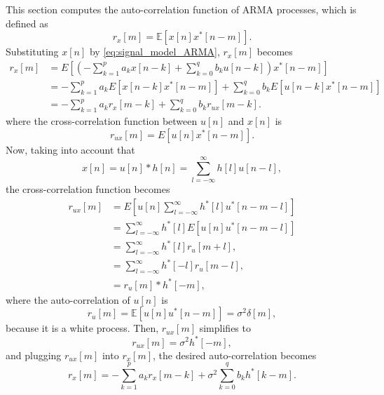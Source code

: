 This section computes the auto-correlation function of ARMA processes, which is defined as
\begin{equation*}
	r_{x}[m] = \mathbb{E}[x[n] x^{\ast}[n-m]].
\end{equation*}
Substituting $x[n]$ by \eqref{eq:signal_model_ARMA}, $r_{x}[m]$ becomes
\begin{align*}
r_{x}[m] &= E\left[ \left(- \sum_{k = 1}^{p} a_k x[n -k]  + \sum_{k = 0}^{q} b_k u[n-k] \right) x^{\ast}[n-m]\right] \nonumber \\
&=  - \sum_{k = 1}^{p} a_k E\left[x[n -k] x^{\ast}[n-m]\right] + \sum_{k = 0}^{q} b_k  E\left[u[n-k]  x^{\ast}[n-m]\right] \nonumber \\
&=  - \sum_{k = 1}^{p} a_k r_{x}[m-k] + \sum_{k = 0}^{q} b_k  r_{ux}[m-k].
\end{align*}
where the cross-correlation function between $u[n]$ and $x[n]$ is
\begin{equation*}
r_{ux}[m] =   E\left[u[n]  x^{\ast}[n-m]\right].
\end{equation*}
Now, taking into account that
\begin{equation*}
x[n] = u[n] \ast h[n] = \sum_{l = -\infty}^{\infty} h[l] u[n-l],
\end{equation*}
the cross-correlation function becomes
\begin{align*}
r_{ux}[m] &=   E\left[u[n]  \sum_{l = -\infty}^{\infty} h^{\ast}[l] u^{\ast}[n-m-l]\right] \nonumber \\
&=   \sum_{l = -\infty}^{\infty} h^{\ast}[l] E\left[u[n]   u^{\ast}[n-m-l]\right] \nonumber \\
&=   \sum_{l = -\infty}^{\infty} h^{\ast}[l] r_u [m+l], \nonumber \\
&=   \sum_{l = -\infty}^{\infty} h^{\ast}[-l] r_u [m-l], \nonumber \\
&=   r_u [m] \ast h^{\ast}[-m],
\end{align*}
where the auto-correlation of $u[n]$ is
\begin{equation*}
r_{u}[m] = \mathbb{E}[u[n] u^{\ast}[n-m]] = \sigma^2 \delta[m],
\end{equation*}
because it is a white process. Then, $r_{ux}[m]$ simplifies to
\begin{equation*}
r_{ux}[m] =  \sigma^2 h^{\ast}[-m],
\end{equation*}
and plugging $r_{ux}[m]$ into $r_{x}[m]$, the desired auto-correlation becomes
\begin{equation*}
r_{x}[m] =  - \sum_{k = 1}^{p} a_k r_{x}[m-k] + \sigma^2 \sum_{k = 0}^{q} b_k  h^{\ast}[k-m].
\end{equation*}
